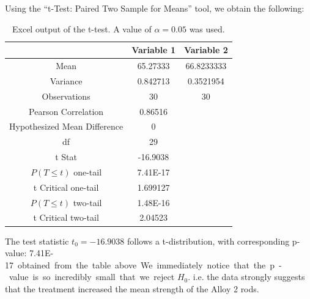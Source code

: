\documentclass[letterpaper]{article}
\begin{document}
Using the ``t-Test: Paired Two Sample for Means'' tool, we obtain the following:

\begin{table}[H]
 \centering
 \begin{tabular}{c|c|c|}
                               & Variable 1 & Variable 2 \\ \hline
  Mean                         & 65.27333   & 66.8233333 \\ \hline
  Variance                     & 0.842713   & 0.3521954  \\ \hline
  Observations                 & 30         & 30         \\ \hline
  Pearson Correlation          & 0.86516    &            \\ \hline
  Hypothesized Mean Difference & 0          &            \\ \hline
  df                           & 29         &            \\ \hline
  t Stat                       & -16.9038   &            \\ \hline
  $P(T \leq t)$ one-tail       & 7.41E-17   &            \\ \hline
  t Critical one-tail          & 1.699127   &            \\ \hline
  $P(T \leq t)$ two-tail       & 1.48E-16   &            \\ \hline
  t Critical two-tail          & 2.04523    &            \\ \hline
 \end{tabular}
 \caption{Excel output of the t-test. A value of $\alpha=0.05$ was used.}
 \label{6a}
\end{table}

The test statistic $t_0 = -16.9038$ follows a t-distribution, with
corresponding p-value: \SI{7.41E-17} obtained from the table above.

We immediately notice that the p-value is so incredibly small that we
reject $H_0$. i.e. the data strongly suggests that the treatment
increased the mean strength of the Alloy 2 rods.

\subsection{}%
\end{document}
